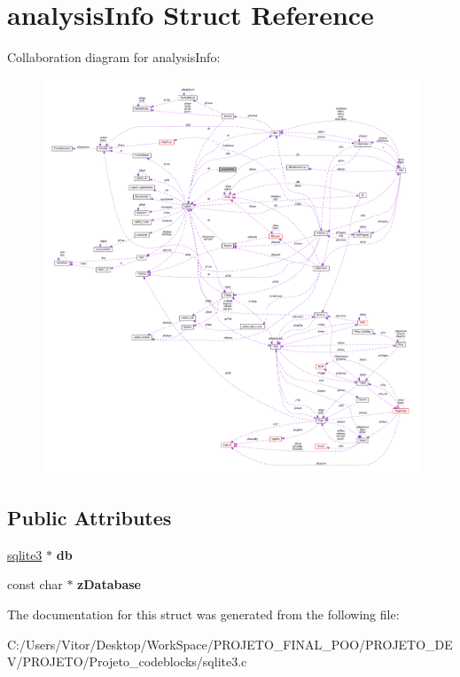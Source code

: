 \hypertarget{structanalysis_info}{\section{analysis\-Info Struct Reference}
\label{structanalysis_info}
}


Collaboration diagram for analysis\-Info\-:\nopagebreak
\begin{figure}[H]
\begin{center}
\leavevmode
\includegraphics[width=350pt]{structanalysis_info__coll__graph}
\end{center}
\end{figure}
\subsection*{Public Attributes}
\begin{DoxyCompactItemize}
\item 
\hypertarget{structanalysis_info_a13108eadc55ffe73a8825fb91cc0f9b5}{\hyperlink{structsqlite3}{sqlite3} $\ast$ {\bfseries db}}\label{structanalysis_info_a13108eadc55ffe73a8825fb91cc0f9b5}

\item 
\hypertarget{structanalysis_info_accbe3c1f5613ffa13b9578e58a5d850a}{const char $\ast$ {\bfseries z\-Database}}\label{structanalysis_info_accbe3c1f5613ffa13b9578e58a5d850a}

\end{DoxyCompactItemize}


The documentation for this struct was generated from the following file\-:\begin{DoxyCompactItemize}
\item 
C\-:/\-Users/\-Vitor/\-Desktop/\-Work\-Space/\-P\-R\-O\-J\-E\-T\-O\-\_\-\-F\-I\-N\-A\-L\-\_\-\-P\-O\-O/\-P\-R\-O\-J\-E\-T\-O\-\_\-\-D\-E\-V/\-P\-R\-O\-J\-E\-T\-O/\-Projeto\-\_\-codeblocks/sqlite3.\-c\end{DoxyCompactItemize}
